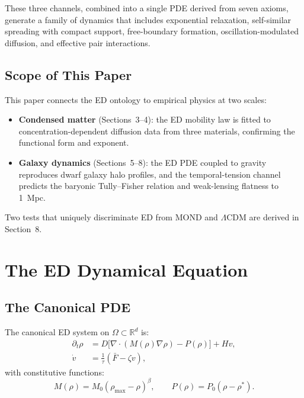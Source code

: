 \documentclass[12pt,letterpaper]{article}
\begin{document}
These three channels, combined into a single PDE derived from seven axioms, generate a family of dynamics that includes exponential relaxation, self-similar spreading with compact support, free-boundary formation, oscillation-modulated diffusion, and effective pair interactions.

\subsection{Scope of This Paper}

This paper connects the ED ontology to empirical physics at two scales:

\begin{itemize}[leftmargin=2em]
\item \textbf{Condensed matter} (Sections~3--4): the ED mobility law is fitted to concentration-dependent diffusion data from three materials, confirming the functional form and exponent.
\item \textbf{Galaxy dynamics} (Sections~5--8): the ED PDE coupled to gravity reproduces dwarf galaxy halo profiles, and the temporal-tension channel predicts the baryonic Tully--Fisher relation and weak-lensing flatness to 1~Mpc.
\end{itemize}

Two tests that uniquely discriminate ED from MOND and $\Lambda$CDM are derived in Section~8.

\section{The ED Dynamical Equation}

\subsection{The Canonical PDE}

The canonical ED system on $\Omega \subset \mathbb{R}^d$ is:
\begin{align}
\partial_t\rho &= D\bigl[\nabla\cdot(M(\rho)\nabla\rho) - P(\rho)\bigr] + Hv, \label{eq:pde}\\
\dot{v} &= \frac{1}{\tau}(\bar{F} - \zeta v), \label{eq:vode}
\end{align}
with constitutive functions:
\begin{equation}
M(\rho) = M_0(\rho_{\max}-\rho)^\beta, \qquad P(\rho) = P_0(\rho - \rho^*). \label{eq:const}
\end{equation}
\end{document}
